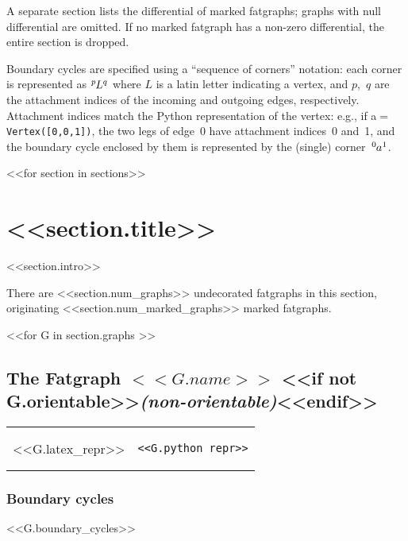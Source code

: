 \documentclass[a4paper]{article}
\newcommand{\corner}[3]{\ensuremath{\tensor[^{#2}]{#1}{^{#3}}}}
\begin{document}
A separate section lists the differential of marked fatgraphs; graphs
with null differential are omitted.  If no marked fatgraph has a
non-zero differential, the entire section is dropped.

Boundary cycles are specified using a ``sequence of corners''
notation: each corner is represented as \corner{L}{p}{q} where $L$ is
a latin letter indicating a vertex, and $p$,~$q$ are the attachment
indices of the incoming and outgoing edges, respectively.  Attachment
indices match the Python representation of the vertex: e.g., if
a$=$\verb'Vertex([0,0,1])', the two legs of edge~$0$ have attachment
indices~0 and~1, and the boundary cycle enclosed by them is
represented by the (single) corner~\corner{a}{0}{1}.

\clearpage


<<for section in sections>>
\section{<<section.title>>}
<<section.intro>>

There are <<section.num_graphs>> undecorated fatgraphs in this section,
originating <<section.num_marked_graphs>> marked fatgraphs.

<<for G in section.graphs >>
\vspace{2em}
\subsection{The Fatgraph $<<G.name>>$%
  <<if not G.orientable>>{\em (non-orientable)}<<endif>>}
\vspace{-1em}
\begin{tabular}{lr}
  \begin{minipage}{0.45\textwidth}
  {%
\hspace{-3em}
<<G.latex_repr>>
  }%
  \end{minipage}
  &%
  \begin{minipage}{0.45\textwidth}
\begin{verbatim}
<<G.python_repr>>
\end{verbatim}
  \end{minipage}
\end{tabular}
\vspace{-3em}

\subsubsection{Boundary cycles}
<<G.boundary_cycles>>
\end{document}

